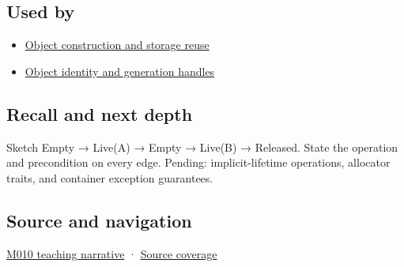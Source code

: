 \subsection{Used by}\label{appendix-f56c3e43fd4e-used-by}

\hypertarget{appendix-f56c3e43fd4e-used-by}{}

\begin{itemize}
\tightlist
\item
  \hyperref[appendix-a82f9c438857]{Object construction and storage reuse}
\item
  \hyperref[appendix-f1581457d322]{Object identity and generation handles}
\end{itemize}

\subsection{Recall and next depth}\label{appendix-f56c3e43fd4e-recall-and-next-depth}

\hypertarget{appendix-f56c3e43fd4e-recall-and-next-depth}{}

Sketch Empty → Live(A) → Empty → Live(B) → Released. State the operation and precondition on every edge. Pending: implicit-lifetime operations, allocator traits, and container exception guarantees.

\subsection{Source and navigation}\label{appendix-f56c3e43fd4e-source-and-navigation}

\hypertarget{appendix-f56c3e43fd4e-source-and-navigation}{}

\hyperref[01-foundations-i-ch004-placement-construction-reuses-storage-it-does-not-allocate-it]{M010 teaching narrative} · \hyperref[appendix-fd090d982a15-m010---parts-148-160]{Source coverage}
